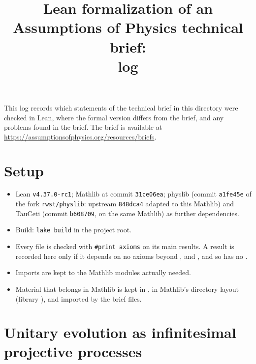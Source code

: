 \documentclass[11pt]{article}
\title{Lean formalization of an Assumptions of Physics technical brief:\\ log}
\author{}
\date{}
\begin{document}
\maketitle

\noindent
This log records which statements of the technical brief in this directory were checked in Lean,
where the formal version differs from the brief, and any problems found in the brief.
The brief is available at \url{https://assumptionsofphysics.org/resources/briefs}.

\section*{Setup}

\begin{itemize}
\item Lean \texttt{v4.37.0-rc1}; Mathlib at commit \texttt{31ce06ea}; physlib (commit \texttt{a1fe45e}
  of the fork \texttt{rwst/physlib}: upstream \texttt{848dca4} adapted to this Mathlib) and
  TauCeti (commit \texttt{b608709}, on the same Mathlib) as further dependencies.
\item Build: \texttt{lake build} in the project root.
\item Every file is checked with \texttt{\#print axioms} on its main results. A result is
  recorded here only if it depends on no axioms beyond ,
   and , and so has no .
\item Imports are kept to the Mathlib modules actually needed.
\item Material that belongs in Mathlib is kept in , in Mathlib's directory
  layout (library ), and imported by the brief files.
\end{itemize}



\section{Unitary evolution as infinitesimal projective processes}
\end{document}

